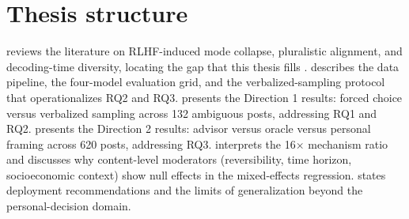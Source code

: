 \section{Thesis structure}
\label{sec:structure}

 reviews the literature on RLHF-induced mode
collapse, pluralistic alignment, and decoding-time diversity, locating
the gap that this thesis fills \citep{ouyang-2022-instructgpt,
bai-2022-constitutional}.  describes the data
pipeline, the four-model evaluation grid, and the verbalized-sampling
protocol that operationalizes RQ2 and RQ3. 
presents the Direction 1 results: forced choice versus verbalized
sampling across 132 ambiguous posts, addressing RQ1 and RQ2.
 presents the Direction 2 results: advisor
versus oracle versus personal framing across 620 posts, addressing
RQ3.  interprets the 16$\times$ mechanism ratio
and discusses why content-level moderators (reversibility, time
horizon, socioeconomic context) show null effects in the
mixed-effects regression.  states deployment
recommendations and the limits of generalization beyond the
personal-decision domain.
